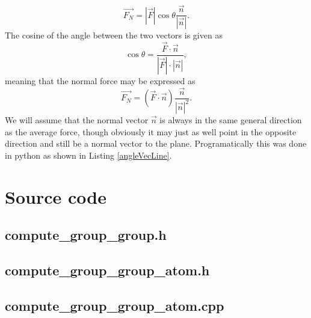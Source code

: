 \documentclass[twoside,english]{uiofysmaster}
\newcommand\lr[1]{\left(#1\right)}
\begin{document}
\begin{equation}
	\vec{F_N} 
	= |\vec{F}|\cos{\theta}\frac{\vec{n}}{|\vec{n}|} .
\end{equation}
The cosine of the angle between the two vectors is given as
\begin{equation}
	\cos{\theta} = \frac{\vec{F}\cdot\vec{n}}{|\vec{F}| \cdot |\vec{n}|},
\end{equation} 
meaning that the normal force may be expressed as
\begin{equation} 
\vec{F_N} = \lr{\vec{F}\cdot\vec{n}} \frac{\vec{n}}{|\vec{n}|^2} .
\end{equation}
We will assume that the normal vector $\vec{n}$ is always in the same general direction as the average force, though obviously it may just as well point in the opposite direction and still be a normal vector to the plane. Programatically this was done in python as shown in Listing \ref{angleVecLine}.






\appendix
\chapter{Source code}

\newpage
\section{compute\_group\_group.h}
\label{groupgrouph}


\newpage
\section{compute\_group\_group\_atom.h}



\newpage
\section{compute\_group\_group\_atom.cpp}






\end{document}
